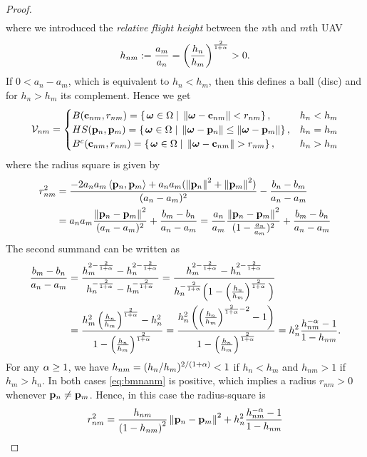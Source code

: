 \documentclass[smallabstract,smallcaptions]{dccpaper}
\newcommand{\Vor}{\ensuremath{\mathcal{V}}}         %
\begin{document}
\begin{proof}
\begin{align}
  \end{align}
  where we introduced the \emph{relative flight height} between the $n$th and $m$th UAV
  \begin{align}
    h_{nm}:= \frac{a_m}{a_n}=\left(\frac{h_n}{h_m}\right)^{\frac{2}{1+\alpha}}>0.
  \end{align}
  If $0<a_n-a_m$, which is equivalent to $h_n<h_m$, then this defines a ball (disc) and for $h_n>h_m$ its complement. Hence we get
  \begin{align}
    \Vor_{nm}=\begin{cases}
      B(\vc_{nm},r_{nm})=\set{\vome\in\Omega}{\Norm{\vome-\vc_{nm}}    <  r_{nm}},&  h_n<h_m\\
      HS(\vp_n,\vp_m) = \set{\vome\in\Omega}{ \Norm{\vome- \vp_n}\leq \Norm{\vome- \vp_m}}, &h_n=h_m\\
      B^c(\vc_{nm},r_{nm})=\set{\vome\in\Omega}{\Norm{\vome-\vc_{nm}}    >  r_{nm}},&  h_n >h_m
    \end{cases}
  \end{align}
  where the radius square is given by
  \begin{align}
    r_{nm}^2 &=  \frac{-2a_n a_m \left\langle {\ensuremath{\mathbf p}}_n,{\mathbf p}_m \right\rangle +a_na_m( \left\|{\mathbf p}_n\right\| ^2 + \left\|{\mathbf p}_m\right\| ^2)}{(a_n-a_m)^2}
            - \frac{b_n-b_m}{a_n-a_m}\\
            &= a_na_m\frac{ \left\|{\mathbf p}_n-{\mathbf p}_m\right\| ^2}{(a_n-a_m)^2} + \frac{b_m-b_n}{a_n-a_m}=
            \frac{a_n}{a_m}\frac{ \left\|{\mathbf p}_n-{\mathbf p}_m\right\| ^2}{(1-\frac{a_n}{a_m})^2} + \frac{b_m-b_n}{a_n-a_m}
  \end{align}
  The second summand can be written as
  \begin{align}
    \frac{b_m -b_n}{a_n -a_m} &
    = \frac{h_m^{2-\frac{2}{1+\alpha}} - h_n^{2-\frac{2}{1+\alpha}}}{h_n^{-\frac{2}{1+\alpha}}-h_m^{-\frac{2}{1+\alpha}}}
    = \frac{h_m^{2-\frac{2}{1+\alpha}} -
    h_n^{2-\frac{2}{1+\alpha}}}{h_n^{-\frac{2}{1+\alpha}}\Big(1-\left(\frac{h_n}{h_m}\right)^{\frac{2}{1+\alpha}}\Big)}\\
    &= \frac{h_m^{2} \left(\frac{h_n}{h_m}\right)^{\frac{2}{1+\alpha}} - h_n^{2}}{1-\left(\frac{h_n}{h_m}\right)^{\frac{2}{1+\alpha}}}
    = \frac{h_n^{2} \left(\left(\frac{h_n}{h_m}\right)^{\frac{2}{1+\alpha}-2} -
  1\right)}{1-\left(\frac{h_n}{h_m}\right)^{\frac{2}{1+\alpha}}} = h_n^2 \frac{h_{nm}^{-\alpha} -1}{1-h_{nm}}
  \label{eq:bmnanm}.
  \end{align}
  For any $\alpha\geq 1$, we have $h_{nm}=(h_n/h_m)^{2/(1+\alpha)}< 1$ if $h_n<h_m$ and $h_{nm}>1$ if $h_m>h_n$.  In
  both cases \eqref{eq:bmnanm} is positive, which implies a radius
  $r_{nm}>0$ whenever ${\mathbf p}_n\not={\mathbf p}_m$.  Hence, in this case the radius-square is
  \begin{align}
    r_{nm}^2=\frac{h_{nm}}{\left(1-h_{nm}\right)^2} \left\|{\mathbf p}_n-{\mathbf p}_m\right\| ^2  + h_n^2 \frac{h_{nm}^{-\alpha} -1}{1-h_{nm}}
  \end{align}
\end{proof}
\end{document}

